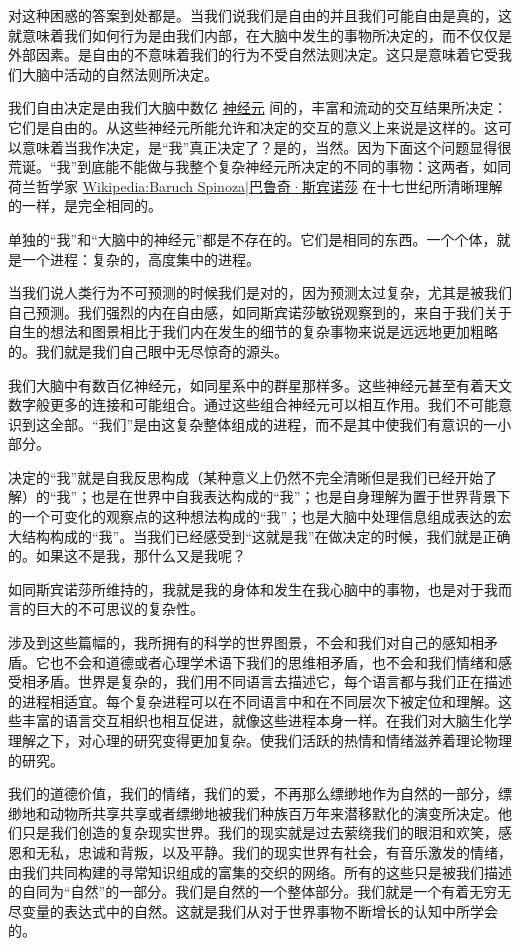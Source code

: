    对这种困惑的答案到处都是。当我们说我们是自由的并且我们可能自由是真的，这就意味着我们如何行为是由我们内部，在大脑中发生的事物所决定的，而不仅仅是外部因素。是自由的不意味着我们的行为不受自然法则决定。这只是意味着它受我们大脑中活动的自然法则所决定。

    我们自由决定是由我们大脑中数亿
\href{http://toyhouse.cc/wiki/index.php/神经元}{神经元}
间的，丰富和流动的交互结果所决定：它们是自由的。从这些神经元所能允许和决定的交互的意义上来说是这样的。这可以意味着当我作决定，是“我”真正决定了？是的，当然。因为下面这个问题显得很荒诞。“我”到底能不能做与我整个复杂神经元所决定的不同的事物：这两者，如同荷兰哲学家
\href{http://toyhouse.cc/wiki/index.php/Wikipedia:Baruch Spinoza|巴鲁奇·斯宾诺莎}{Wikipedia:Baruch Spinoza|巴鲁奇·斯宾诺莎}
在十七世纪所清晰理解的一样，是完全相同的。

    单独的“我”和“大脑中的神经元”都是不存在的。它们是相同的东西。一个个体，就是一个进程：复杂的，高度集中的进程。

    当我们说人类行为不可预测的时候我们是对的，因为预测太过复杂，尤其是被我们自己预测。我们强烈的内在自由感，如同斯宾诺莎敏锐观察到的，来自于我们关于自生的想法和图景相比于我们内在发生的细节的复杂事物来说是远远地更加粗略的。我们就是我们自己眼中无尽惊奇的源头。

    我们大脑中有数百亿神经元，如同星系中的群星那样多。这些神经元甚至有着天文数字般更多的连接和可能组合。通过这些组合神经元可以相互作用。我们不可能意识到这全部。“我们”是由这复杂整体组成的进程，而不是其中使我们有意识的一小部分。
 
   决定的“我”就是自我反思构成（某种意义上仍然不完全清晰但是我们已经开始了解）的“我”；也是在世界中自我表达构成的“我”；也是自身理解为置于世界背景下的一个可变化的观察点的这种想法构成的“我”；也是大脑中处理信息组成表达的宏大结构构成的“我”。当我们已经感受到“这就是我”在做决定的时候，我们就是正确的。如果这不是我，那什么又是我呢？

    如同斯宾诺莎所维持的，我就是我的身体和发生在我心脑中的事物，也是对于我而言的巨大的不可思议的复杂性。

    涉及到这些篇幅的，我所拥有的科学的世界图景，不会和我们对自己的感知相矛盾。它也不会和道德或者心理学术语下我们的思维相矛盾，也不会和我们情绪和感受相矛盾。世界是复杂的，我们用不同语言去描述它，每个语言都与我们正在描述的进程相适宜。每个复杂进程可以在不同语言中和在不同层次下被定位和理解。这些丰富的语言交互相织也相互促进，就像这些进程本身一样。在我们对大脑生化学理解之下，对心理的研究变得更加复杂。使我们活跃的热情和情绪滋养着理论物理的研究。

    我们的道德价值，我们的情绪，我们的爱，不再那么缥缈地作为自然的一部分，缥缈地和动物所共享共享或者缥缈地被我们种族百万年来潜移默化的演变所决定。他们只是我们创造的复杂现实世界。我们的现实就是过去萦绕我们的眼泪和欢笑，感恩和无私，忠诚和背叛，以及平静。我们的现实世界有社会，有音乐激发的情绪，由我们共同构建的寻常知识组成的富集的交织的网络。所有的这些只是被我们描述的自同为“自然”的一部分。我们是自然的一个整体部分。我们就是一个有着无穷无尽变量的表达式中的自然。这就是我们从对于世界事物不断增长的认知中所学会的。
 
